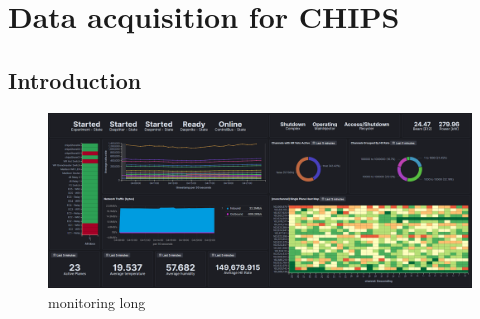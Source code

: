 \chapter{Data acquisition for CHIPS}
\label{chap:daq}

\section{Introduction}
\label{sec:daq_intro}

\begin{figure} %
    \includegraphics[width=\textwidth]{diagrams/5-daq/monitoring.png}
    \caption[monitoring short]
    {monitoring long}
    \label{fig:monitoring}
\end{figure} %

